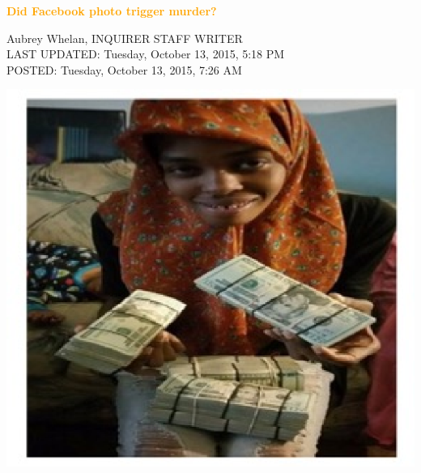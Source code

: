 \documentclass{tikzposter} %
\begin{document}
\begin{columns}
{\begin{itemize}
\begin{enumerate}
  	\begin{minipage}{0.69\linewidth}	
		\centering
		\textbf{\large{\textcolor{orange}{Did Facebook photo trigger murder?}}}	
		\vspace{.1cm}
		\begin{description}
			\item
			{\textcolor{blue!60}{Aubrey Whelan, INQUIRER STAFF WRITER\\
			LAST UPDATED: Tuesday, October 13, 2015, 5:18 PM\\
			POSTED: Tuesday, October 13, 2015, 7:26 AM}}
		\end{description}		
	\end{minipage}	
  	\begin{minipage}{0.3\linewidth}
 	 	\begin{tikzfigure}
			\includegraphics[scale=0.7]{./figures/theme2/case3_1.eps}
		 \end{tikzfigure}
	\end{minipage}	
	
	\fbox{
	\centering

}
\end{enumerate}
\end{itemize}}
\end{columns}
\end{document}
